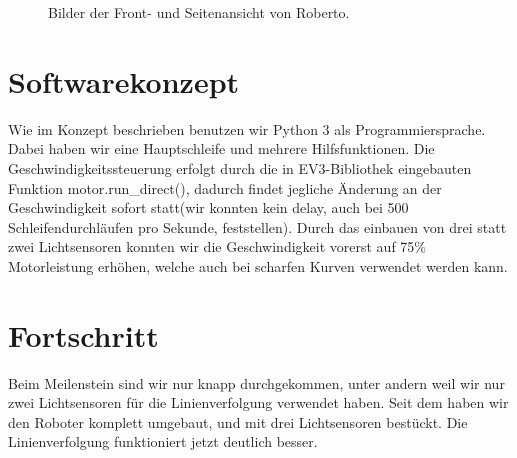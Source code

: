 \documentclass[11pt]{article}
\begin{document}
\begin{figure}[H]
  \centering
  \caption{Bilder der Front- und Seitenansicht von Roberto.}
  \label{Figure:RobotPics}  %
\end{figure}

\section{Softwarekonzept}
Wie im Konzept beschrieben benutzen wir Python 3 als Programmiersprache. Dabei haben wir eine Hauptschleife und mehrere Hilfsfunktionen. Die Geschwindigkeitssteuerung erfolgt durch die in EV3-Bibliothek eingebauten Funktion motor.run\_direct(), dadurch findet jegliche Änderung an der Geschwindigkeit sofort statt(wir konnten kein delay, auch bei 500 Schleifendurchläufen pro Sekunde, feststellen). Durch das einbauen von drei statt zwei Lichtsensoren konnten wir die Geschwindigkeit vorerst auf 75\% Motorleistung erhöhen, welche auch bei scharfen Kurven verwendet werden kann.

\section{Fortschritt}
Beim Meilenstein sind wir nur knapp durchgekommen, unter andern weil wir nur zwei Lichtsensoren für die Linienverfolgung verwendet haben. Seit dem haben wir den Roboter komplett umgebaut, und mit drei Lichtsensoren bestückt. Die Linienverfolgung funktioniert jetzt deutlich besser.
\end{document}
